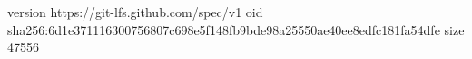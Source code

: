 version https://git-lfs.github.com/spec/v1
oid sha256:6d1e371116300756807c698e5f148fb9bde98a25550ae40ee8edfc181fa54dfe
size 47556
